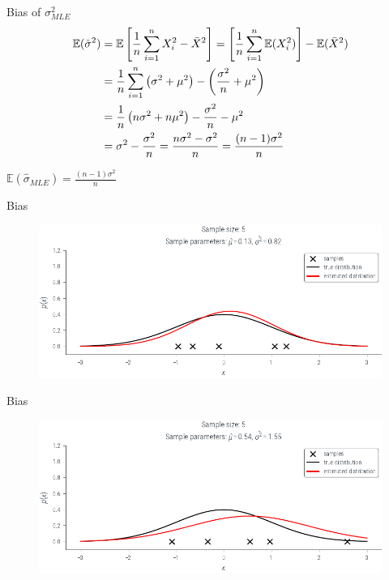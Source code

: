 \documentclass{beamer}
\begin{document}
    \begin{frame}{Bias of $\sigma^2_{MLE}$}
        \begin{align*}
            \mathbb{E}(\hat{\sigma}^2) &=\mathbb{E}\left[\frac{1}{n}\sum_{i=1}^nX_i^2-\Bar{X}^2 \right] = \left[\frac{1}{n}\sum_{i=1}^n\mathbb{E}(X_i^2)\right]-\mathbb{E}(\Bar{X}^2)\\
            &=\frac{1}{n}\sum_{i=1}^n\left(\sigma^2+\mu^2\right) - \left(\frac{\sigma^2}{n}+\mu^2\right)\\
            &=\frac{1}{n}\left(n\sigma^2+n\mu^2\right) - \frac{\sigma^2}{n}-\mu^2\\
            &= \sigma^2 - \frac{\sigma^2}{n} = \frac{n\sigma^2-\sigma^2}{n} = \frac{(n-1)\sigma^2}{n}
        \end{align*}
        \begin{tcolorbox}[colback=metropolisblue!5,colframe=metropolisblue,title= Estimator $\hat{\sigma}_{MLE}$ is biased]
            $\mathbb{E}(\hat{\sigma}_{MLE}) = \frac{(n-1)\sigma^2}{n}$
        \end{tcolorbox}
    \end{frame}

        \begin{frame}{Bias }
            \begin{figure}
                \includegraphics{../figures/mle/biased-mle-normal-5-0.pdf}
            \end{figure}
            
        \end{frame}

             \begin{frame}{Bias }
            \begin{figure}
                \includegraphics{../figures/mle/biased-mle-normal-5-1.pdf}
            \end{figure}
            
        \end{frame}
\end{document}
